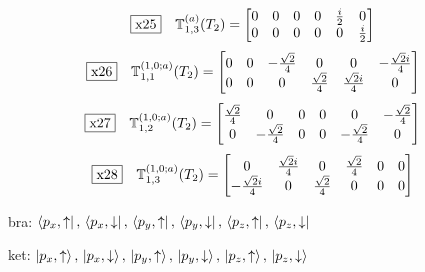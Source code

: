 \documentclass[fleqn,10pt,landscape]{jsarticle}
\begin{document}
\begin{dmath*}
\fbox{x25}\quad \mathbb{T}_{1,3}^{(a)}(T_{2})=\begin{bmatrix} 0 & 0 & 0 & 0 & \frac{i}{2} & 0 \\ 0 & 0 & 0 & 0 & 0 & \frac{i}{2} \end{bmatrix}
\end{dmath*}
\begin{dmath*}
\fbox{x26}\quad \mathbb{T}_{1,1}^{(1,0;a)}(T_{2})=\begin{bmatrix} 0 & 0 & - \frac{\sqrt{2}}{4} & 0 & 0 & - \frac{\sqrt{2} i}{4} \\ 0 & 0 & 0 & \frac{\sqrt{2}}{4} & \frac{\sqrt{2} i}{4} & 0 \end{bmatrix}
\end{dmath*}
\begin{dmath*}
\fbox{x27}\quad \mathbb{T}_{1,2}^{(1,0;a)}(T_{2})=\begin{bmatrix} \frac{\sqrt{2}}{4} & 0 & 0 & 0 & 0 & - \frac{\sqrt{2}}{4} \\ 0 & - \frac{\sqrt{2}}{4} & 0 & 0 & - \frac{\sqrt{2}}{4} & 0 \end{bmatrix}
\end{dmath*}
\begin{dmath*}
\fbox{x28}\quad \mathbb{T}_{1,3}^{(1,0;a)}(T_{2})=\begin{bmatrix} 0 & \frac{\sqrt{2} i}{4} & 0 & \frac{\sqrt{2}}{4} & 0 & 0 \\ - \frac{\sqrt{2} i}{4} & 0 & \frac{\sqrt{2}}{4} & 0 & 0 & 0 \end{bmatrix}
\end{dmath*}
\vspace{5mm}

\noindent\textbullet\, bra: $\bra{p_{x},\uparrow},\, \bra{p_{x},\downarrow},\, \bra{p_{y},\uparrow},\, \bra{p_{y},\downarrow},\, \bra{p_{z},\uparrow},\, \bra{p_{z},\downarrow}$

\noindent\textbullet\, ket: $\ket{p_{x},\uparrow},\, \ket{p_{x},\downarrow},\, \ket{p_{y},\uparrow},\, \ket{p_{y},\downarrow},\, \ket{p_{z},\uparrow},\, \ket{p_{z},\downarrow}$
\end{document}
